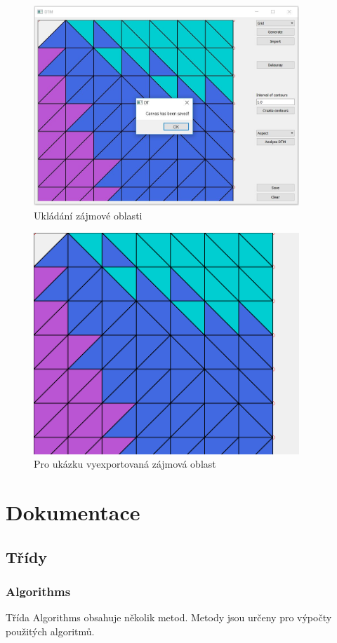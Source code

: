 \documentclass[a4paper, 12pt]{article}
\begin{document}
\begin{figure}[h!]
\centering
\includegraphics[width=10cm]{pictures/saved.jpg}
\caption{Ukládání zájmové oblasti}
\end{figure}

\begin{figure}[h!]
\centering
\includegraphics[width=10cm]{pictures/exported.png}
\caption{Pro ukázku vyexportovaná zájmová oblast}
\end{figure}

\clearpage



\section{Dokumentace}
\subsection{Třídy}
\subsubsection{Algorithms}
Třída Algorithms obsahuje několik metod. Metody jsou určeny pro výpočty použitých algoritmů.
\\
\end{document}

